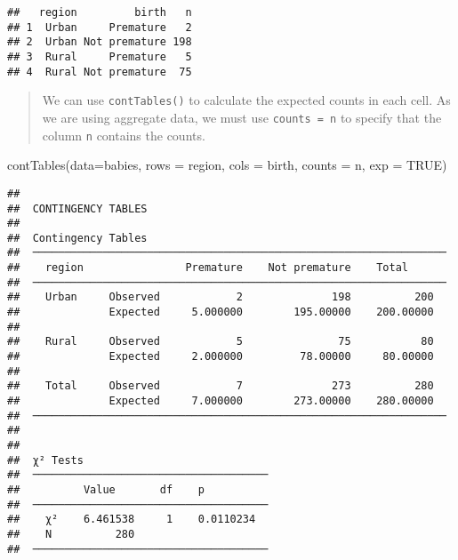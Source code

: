 \documentclass[
]{memoir}
\newenvironment{Shaded}{\begin{snugshade}}{\end{snugshade}}
\newcommand{\AttributeTok}[1]{\textcolor[rgb]{0.77,0.63,0.00}{#1}}
\newcommand{\ConstantTok}[1]{\textcolor[rgb]{0.00,0.00,0.00}{#1}}
\newcommand{\FunctionTok}[1]{\textcolor[rgb]{0.00,0.00,0.00}{#1}}
\newcommand{\NormalTok}[1]{#1}
\begin{document}
\begin{verbatim}
##   region         birth   n
## 1  Urban     Premature   2
## 2  Urban Not premature 198
## 3  Rural     Premature   5
## 4  Rural Not premature  75
\end{verbatim}

\begin{quote}
We can use \texttt{contTables()} to calculate the expected counts in each cell. As we are using aggregate data, we must use \texttt{counts\ =\ n} to specify that the column \texttt{n} contains the counts.
\end{quote}

\begin{Shaded}
\begin{Highlighting}[]
\FunctionTok{contTables}\NormalTok{(}\AttributeTok{data=}\NormalTok{babies,}
           \AttributeTok{rows =}\NormalTok{ region, }\AttributeTok{cols =}\NormalTok{ birth, }\AttributeTok{counts =}\NormalTok{ n,}
           \AttributeTok{exp =} \ConstantTok{TRUE}\NormalTok{)}
\end{Highlighting}
\end{Shaded}

\begin{verbatim}
## 
##  CONTINGENCY TABLES
## 
##  Contingency Tables                                                
##  ───────────────────────────────────────────────────────────────── 
##    region                Premature    Not premature    Total       
##  ───────────────────────────────────────────────────────────────── 
##    Urban     Observed            2              198          200   
##              Expected     5.000000        195.00000    200.00000   
##                                                                    
##    Rural     Observed            5               75           80   
##              Expected     2.000000         78.00000     80.00000   
##                                                                    
##    Total     Observed            7              273          280   
##              Expected     7.000000        273.00000    280.00000   
##  ───────────────────────────────────────────────────────────────── 
## 
## 
##  χ² Tests                              
##  ───────────────────────────────────── 
##          Value       df    p           
##  ───────────────────────────────────── 
##    χ²    6.461538     1    0.0110234   
##    N          280                      
##  ─────────────────────────────────────
\end{verbatim}
\end{document}
